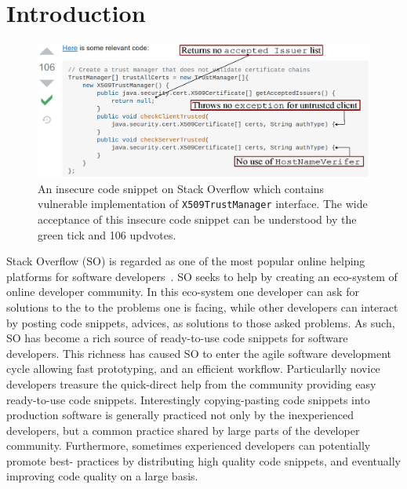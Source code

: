 \section{Introduction}
   \label{into}

   \begin{figure}
   \includegraphics[width=\linewidth]{Figures/SO_ss.eps}
   \caption{An  insecure code snippet on Stack Overflow which contains vulnerable implementation of \texttt{X509TrustManager} interface. 
   The wide acceptance of this insecure code snippet can be understood by the green tick and 106 updvotes.}
   \label{fig:SO_screenshot}
   \end{figure}
   
   Stack Overflow (SO) is regarded as one of the most popular online helping platforms for software developers~\cite{8816778}. 
   SO seeks to help by creating an eco-system of online developer community. 
   In this eco-system one developer can ask for solutions to the to the problems one is facing, while other developers can interact by posting code snippets, advices, as solutions to those asked problems. 
   As such, SO has become a rich source of ready-to-use code snippets for software developers. 
   This richness has caused SO to enter the agile software development cycle allowing fast prototyping, and an efficient workflow. Particularlly novice developers treasure the quick-direct help from the community providing easy ready-to-use code snippets.
   Interestingly copying-pasting code snippets into production software is generally practiced not only by the inexperienced developers, but a common practice shared by large parts of the developer community. Furthermore, sometimes experienced developers can potentially promote best- practices by distributing high quality code snippets, and eventually improving code quality on a large basis.

